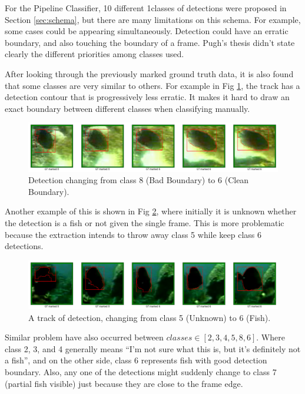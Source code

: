 \documentclass[bsc,logo,twoside,fullspacing,parskip]{infthesis}
\begin{document}
For the Pipeline Classifier, 10 different 1classes of detections were proposed in Section \ref{sec:schema}, but there are many limitations on this schema.
For example, some cases could be appearing simultaneously. Detection could have an erratic boundary, and also touching the boundary of a frame. Pugh's thesis didn't state clearly the different priorities among classes used. 

After looking through the previously marked ground truth data, it is also found that some classes are very similar to others. For example in Fig \ref{fig:class68}, the track has a detection contour that is progressively less erratic. It makes it hard to draw an exact boundary between different classes when classifying manually.

\begin{figure}[h]
\centering
    \includegraphics[scale=0.34]{graph/6-8.png}
    \caption{Detection changing from class 8 (Bad Boundary) to 6 (Clean Boundary).}
    \label{fig:class68}
\end{figure}

Another example of this is shown in Fig \ref{fig:class56}, where initially it is unknown whether the detection is a fish or not given the single frame. This is more problematic because the extraction intends to throw away class 5 while keep class 6 detections. 

\begin{figure}[ht]
\centering
    \includegraphics[scale=0.34]{graph/5-6.png}
    \caption{A track of detection, changing from class 5 (Unknown) to 6 (Fish).}
    \label{fig:class56}
\end{figure}

Similar problem have also occurred between \(classes\in[2,3,4,5,8,6]\). Where class 2, 3, and 4 generally means ``I'm not sure what this is, but it's definitely not a fish'', and on the other side, class 6 represents fish with good detection boundary. 
Also, any one of the detections might suddenly change to class 7 (partial fish visible) just because they are close to the frame edge. 
\end{document}
